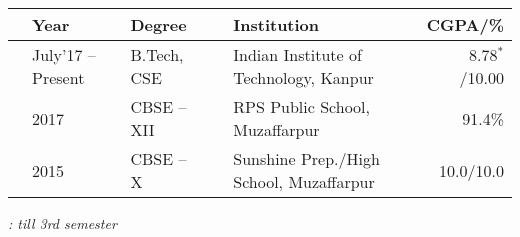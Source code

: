 
\newcommand{\education}[4]{
  & #1 & #2 & &#3 & #4
}
\begin{tabular}{ | L{0.05cm} l | L{3cm} | L{0.05cm} C{8cm} | r |}
  \hline
  \education{\textbf{Year}}{\textbf{Degree}}{\textbf{Institution}}{\textbf{CGPA/\%}}\\
  \hline
  \education{July'17 -- Present}{B.Tech, CSE}{Indian Institute of Technology, Kanpur}{8.78$^{*}$/10.00}\\
  \education{2017}{CBSE -- XII}{RPS Public School, Muzaffarpur}{91.4\%}\\
  \education{2015}{CBSE -- X}{Sunshine Prep./High School, Muzaffarpur}{10.0/10.0}\\
  \hline
\end{tabular}
\begin{flushright}
\textit{\hfill * : till 3rd semester}
\end{flushright}

